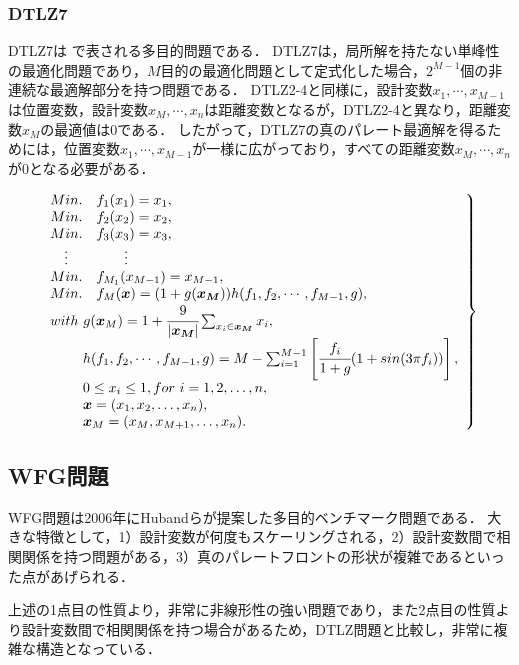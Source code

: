 \documentclass[../main/main]{subfiles}
\begin{document}
\subsubsection{DTLZ7}
DTLZ7は    で表される多目的問題である．
DTLZ7は，局所解を持たない単峰性の最適化問題であり，$M$目的の最適化問題として定式化した場合，$2^{M-1}$個の非連続な最適解部分を持つ問題である．
DTLZ2-4と同様に，設計変数$x_1,\cdots,x_{M-1}$は位置変数，設計変数$x_M,\cdots,x_n$は距離変数となるが，DTLZ2-4と異なり，距離変数$x_M$の最適値は$0$である．
したがって，DTLZ7の真のパレート最適解を得るためには，位置変数$x_1,\cdots,x_{M-1}$が一様に広がっており，すべての距離変数$x_M,\cdots,x_n$が$0$となる必要がある．

\begin{eqnarray} 
\left.
\begin{array}{ll}
Min. \quad f_{1}  (x_1) = x_1,\\
Min. \quad f_{2} (x_2) = x_2, \\
Min. \quad f_{3} (x_3) = x_3, \\
     \  \  \ $\vdots$    \qquad       \qquad \vdots \\
Min. \quad f_{M_1}(x_{M-1}) = x_{M-1},\\
Min. \quad f_{M} (\bm x) = (1 + g(\bm{x_M}))h(f_1,f_2,\cdots,f_{M-1},g),\\
with\ g(\bm{x}_{M}) = 1 + \cfrac{9}{|\bm{x_M}|} \sum_{x_i \in \bm{x_M}} x_i,  \\
\quad \quad \ h(f_1,f_2,\cdots,f_{M-1},g) = M - \sum^{M-1}_{i = 1}\left[ \cfrac{f_i}{1+g} (1 + sin(3\pi f_i))\right],\\
   \qquad    \  0 \le x_{i} \le 1,  for\ i = 1, 2, \ldots, n, \\
      \qquad    \        \bm x = (x_1,x_2, \ldots, x_n),\\
   \qquad    \        \bm{x}_M = (x_M,x_{M+1}, \ldots, x_n).
   \label{dtlz7} 
\end{array}
\right\}
\end{eqnarray}

\newpage

\subsection{WFG問題}
WFG問題\cite{}は2006年にHubandらが提案した多目的ベンチマーク問題である．
大きな特徴として，1）設計変数が何度もスケーリングされる，2）設計変数間で相関関係を持つ問題がある，3）真のパレートフロントの形状が複雑であるといった点があげられる．

上述の1点目の性質より，非常に非線形性の強い問題であり，また2点目の性質より設計変数間で相関関係を持つ場合があるため，DTLZ問題と比較し，非常に複雑な構造となっている．
\end{document}
